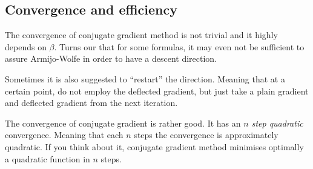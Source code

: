 \subsection{Convergence and efficiency}
\par The convergence of conjugate gradient method is not trivial and it highly depends on $\beta$. Turns our that for some formulas, it may even not be sufficient to assure Armijo-Wolfe in order to have a descent direction.
\par Sometimes it is also suggested to ``restart'' the direction. Meaning that at a certain point, do not employ the deflected gradient, but just take a plain gradient and deflected gradient from the next iteration.
\par The convergence of conjugate gradient is rather good. It has an \textit{$n$ step quadratic} convergence. Meaning that each $n$ steps the convergence is approximately quadratic. If you think about it, conjugate gradient method minimises optimally a quadratic function in $n$ steps.
%
%
%

